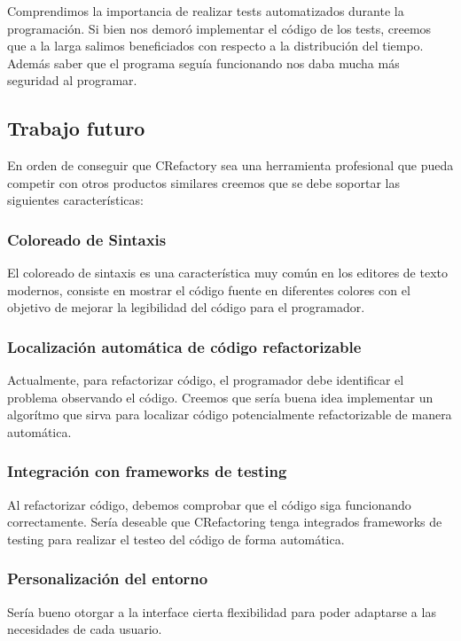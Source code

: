 \documentclass[a4paper,oneside,12pt]{article}
\begin{document}
Comprendimos la importancia de realizar tests automatizados durante la programaci\'on. Si bien nos demor\'o implementar el c\'odigo de los tests, creemos que a la larga salimos beneficiados con respecto a la distribuci\'on del tiempo. Adem\'as saber que el programa segu\'ia funcionando nos daba mucha m\'as seguridad al programar.

\subsection{Trabajo futuro}
En orden de conseguir que CRefactory sea una herramienta profesional que pueda competir con otros productos similares creemos que se debe soportar las siguientes caracter\'isticas:

\subsubsection{Coloreado de Sintaxis}
El coloreado de sintaxis es una caracter\'istica muy com\'un en los editores de texto modernos, consiste en mostrar el c\'odigo fuente en diferentes colores con el objetivo de mejorar la legibilidad del c\'odigo para el programador.

\subsubsection{Localizaci\'on autom\'atica de c\'odigo refactorizable}
Actualmente, para refactorizar c\'odigo, el programador debe identificar el problema observando el c\'odigo. Creemos que ser\'ia buena idea implementar un algor\'itmo que sirva para localizar c\'odigo potencialmente refactorizable de manera autom\'atica.

\subsubsection{Integraci\'on con frameworks de testing}
Al refactorizar c\'odigo, debemos comprobar que el c\'odigo siga funcionando correctamente. Ser\'ia deseable que CRefactoring tenga integrados frameworks de testing para realizar el testeo del c\'odigo de forma autom\'atica.

\subsubsection{Personalizaci\'on del entorno}
Ser\'ia bueno otorgar a la interface cierta flexibilidad para poder adaptarse a las necesidades de cada usuario.
\end{document}
